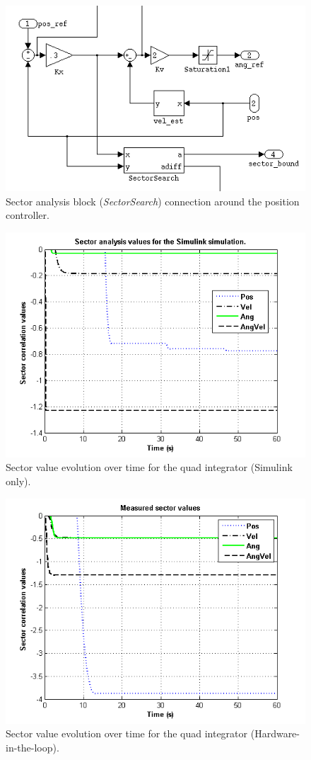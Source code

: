 \begin{figure}[thpb]
\centering
\includegraphics[width=0.75\columnwidth]{img/sectorconn}
    \caption{Sector analysis block (\emph{SectorSearch}) connection around the position controller.}
    \label{fig:sectorconn}
\end{figure}



\begin{figure}[thpb]
\centering
\includegraphics[width=0.75\columnwidth]{img/simsectors}
\caption{Sector value evolution over time for the quad integrator (Simulink only).}
\label{fig:sectors1} 
\end{figure}

\begin{figure}[thpb]
\centering
\includegraphics[width=0.75\columnwidth]{img/meassectors}
\caption{Sector value evolution over time for the quad integrator (Hardware-in-the-loop).}
\label{fig:sectors2} 
\end{figure}



